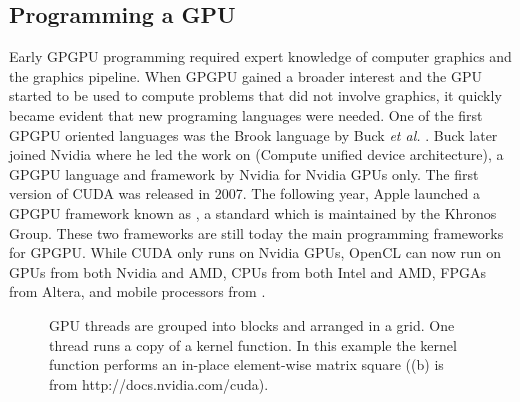 \subsection{Programming a GPU}
Early GPGPU programming required expert knowledge of computer graphics and the graphics pipeline. When GPGPU gained a broader interest and the GPU started to be used to compute problems that did not involve graphics, it quickly became evident that new programing languages were needed.  One of the first GPGPU oriented languages was the Brook language by Buck \textit{et al.} \cite{Buck2004}. Buck later joined Nvidia where he led the work on  (Compute unified device architecture), a GPGPU language and framework by Nvidia for Nvidia GPUs only. The first version of CUDA was released in 2007. The following year, Apple launched a GPGPU framework known as , a standard which is maintained by the Khronos Group. These two frameworks are still today the main programming frameworks for GPGPU. While CUDA only runs on Nvidia GPUs, OpenCL can now run on GPUs from both Nvidia and AMD, CPUs from both Intel and AMD, FPGAs from Altera, and mobile processors from .

\begin{figure}[t!]
\centering
{}
\caption{GPU threads are grouped into blocks and arranged in a grid. One thread runs a copy of a kernel function. In this example the kernel function performs an in-place element-wise matrix square ((b) is from http://docs.nvidia.com/cuda).}
\label{fig:gpu_grid_kernel}
\end{figure}


